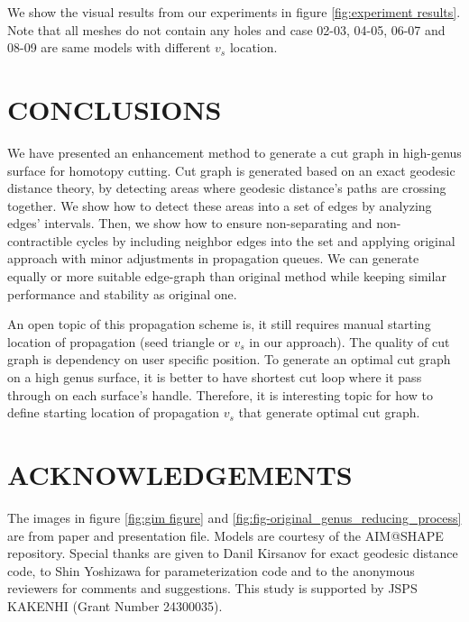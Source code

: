 \documentclass[a4paper,twoside]{article}
\begin{document}
We show the visual results from our experiments in figure \ref{fig:experiment results}. Note that all meshes do not contain any holes and case 02-03, 04-05, 06-07 and 08-09 are same models with different $v_s$ location.

\section{\uppercase{Conclusions}}
\label{sec:conclusion}

\noindent We have presented an enhancement method to generate a cut graph in high-genus surface for homotopy cutting. Cut graph is generated based on an exact geodesic distance theory, by detecting areas where geodesic distance's paths are crossing together. We show how to detect these areas into a set of edges by analyzing edges' intervals. Then, we show how to ensure non-separating and non-contractible cycles by including neighbor edges into the set and applying original approach with minor adjustments in propagation queues. We can generate equally or more suitable edge-graph than original method while keeping similar performance and stability as original one.

An open topic of this propagation scheme is, it still requires manual starting location of propagation (seed triangle or $v_s$ in our approach). The quality of cut graph is dependency on user specific position.  To generate an optimal cut graph on a high genus surface, it is better to have shortest cut loop where it pass through on each surface's handle. Therefore, it is interesting topic for how to define starting location of propagation $v_s$ that generate optimal cut graph.


\section*{\uppercase{Acknowledgements}}
\noindent The images in figure \ref{fig:gim figure} and \ref{fig:fig-original_genus_reducing_process}  are from \cite{Gu:2002:GI:566654.566589} paper and presentation file. Models are courtesy of the AIM@SHAPE repository. Special thanks are given to Danil Kirsanov for exact geodesic distance code, to Shin Yoshizawa for parameterization code and to the anonymous reviewers for comments and suggestions.
This study is supported by JSPS KAKENHI (Grant Number 24300035).




{\small
}
\vfill
\end{document}
